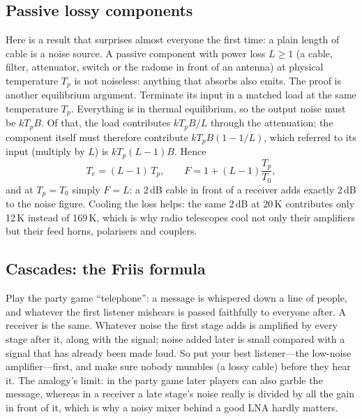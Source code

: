 \subsection{Passive lossy components}

Here is a result that surprises almost everyone the first time: a plain length of cable is a noise
source. A passive component with power loss $L\ge1$ (a cable, filter, attenuator, switch or the radome
in front of an antenna) at physical temperature $T_p$ is not noiseless: anything that absorbs also
emits. The proof is another equilibrium argument. Terminate its input in a matched load at the same
temperature $T_p$. Everything is in thermal equilibrium, so the output noise must be $kT_pB$. Of that,
the load contributes $kT_pB/L$ through the attenuation; the component itself must therefore contribute
$kT_pB(1-1/L)$, which referred to its input (multiply by $L$) is $kT_p(L-1)B$. Hence
\begin{equation}
T_e=(L-1)\,T_p,\qquad F=1+(L-1)\frac{T_p}{T_0},
\label{eq:ch03:lossy}
\end{equation}
and at $T_p=T_0$ simply $F=L$: a 2\,dB cable in front of a receiver adds exactly 2\,dB to the noise
figure. Cooling the loss helps: the same 2\,dB at 20\,K contributes only 12\,K instead of 169\,K, which is
why radio telescopes cool not only their amplifiers but their feed horns, polarisers and couplers.

\subsection{Cascades: the Friis formula}


\begin{analogy}
Play the party game ``telephone'': a message is whispered down a line of people, and whatever the
first listener mishears is passed faithfully to everyone after. A receiver is the same. Whatever noise
the first stage adds is amplified by every stage after it, along with the signal; noise added later is
small compared with a signal that has already been made loud. So put your best listener---the
low-noise amplifier---first, and make sure nobody mumbles (a lossy cable) before they hear it. The
analogy's limit: in the party game later players can also garble the message, whereas in a receiver a
late stage's noise really is divided by all the gain in front of it, which is why a noisy mixer behind
a good LNA hardly matters.
\end{analogy}

